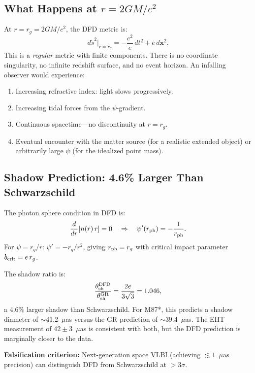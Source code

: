 \documentclass[aps,prd,twocolumn,superscriptaddress,nofootinbib]{revtex4-2}
\begin{document}
\subsection{What Happens at $r = 2GM/c^2$}

At $r = r_g = 2GM/c^2$, the DFD metric is:
\begin{equation}
d\tilde{s}^2\big|_{r=r_g} = -\frac{c^2}{e}\,dt^2 + e\,d\mathbf{x}^2.
\end{equation}
This is a \textit{regular} metric with finite components. There is
no coordinate singularity, no infinite redshift surface, and no
event horizon. An infalling observer would experience:

\begin{enumerate}[nosep]
\item Increasing refractive index: light slows progressively.
\item Increasing tidal forces from the $\psi$-gradient.
\item Continuous spacetime---no discontinuity at $r = r_g$.
\item Eventual encounter with the matter source (for a
  realistic extended object) or arbitrarily large $\psi$ (for
  the idealized point mass).
\end{enumerate}

\subsection{Shadow Prediction: 4.6\% Larger Than Schwarzschild}

The photon sphere condition in DFD is:
\begin{equation}
\frac{d}{dr}[n(r)\,r] = 0 \quad\Rightarrow\quad
\psi'(r_{\rm ph}) = -\frac{1}{r_{\rm ph}}.
\end{equation}
For $\psi = r_g/r$: $\psi' = -r_g/r^2$, giving
$r_{\rm ph} = r_g$ with critical impact parameter
$b_{\rm crit} = e\,r_g$.

The shadow ratio is:
\begin{equation}\label{eq:shadow-ratio}
\frac{\theta_{\rm sh}^{\rm DFD}}{\theta_{\rm sh}^{\rm GR}}
= \frac{2e}{3\sqrt{3}} = 1.046,
\end{equation}
a 4.6\% larger shadow than Schwarzschild. For M87*, this predicts
a shadow diameter of $\sim$41.2~$\mu$as versus the GR prediction
of $\sim$39.4~$\mu$as. The EHT measurement of $42 \pm 3$~$\mu$as
is consistent with both, but the DFD prediction is marginally
closer to the data.

\textbf{Falsification criterion:} Next-generation space VLBI
(achieving $\lesssim 1$~$\mu$as precision) can distinguish DFD
from Schwarzschild at $>3\sigma$.
\end{document}
